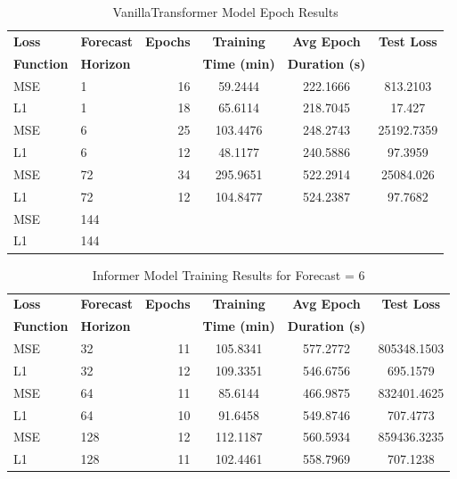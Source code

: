 \documentclass{article}
\begin{document}
\begin{table}
    \footnotesize
    \centering
    \caption{VanillaTransformer Model Epoch Results}
    \begin{tabular}{l|l|r|S|S|S}
        \toprule
        \textbf{Loss} & \textbf{Forecast} & \textbf{Epochs} & \textbf{Training} & \textbf{Avg Epoch} & \textbf{Test Loss} \\
        \textbf{Function} & \textbf{Horizon} & & \textbf{Time (min)} & \textbf{Duration (s)} & \\
        \midrule
        MSE & 1 & 16 & 59.2444 & 222.1666 & 813.2103 \\
        L1 & 1 & 18 & 65.6114 & 218.7045 & 17.427 \\
        \midrule
        MSE & 6 & 25 & 103.4476 & 248.2743 & 25192.7359 \\
        L1 & 6 & 12 & 48.1177 & 240.5886 & 97.3959 \\
        \midrule
        MSE & 72 & 34 & 295.9651 & 522.2914 & 25084.026 \\
        L1 & 72 & 12 & 104.8477 & 524.2387 & 97.7682 \\
        \midrule
        MSE & 144 &  &  &  &  \\
        L1 & 144 &  &  &  &  \\
    \bottomrule
    \end{tabular}
    \label{tab:vanillatransformer_epoch}
\end{table}

\begin{table}
    \centering
    \caption{Informer Model Training Results for Forecast = 6}
    \begin{tabular}{l|l|r|S|S|S}
        \toprule
        \textbf{Loss} & \textbf{Forecast} & \textbf{Epochs} & \textbf{Training} & \textbf{Avg Epoch} & \textbf{Test Loss} \\
        \textbf{Function} & \textbf{Horizon} & & \textbf{Time (min)} & \textbf{Duration (s)} & \\
        \midrule
        MSE & 32 & 11 & 105.8341 & 577.2772 & 805348.1503 \\
        L1 & 32 & 12 & 109.3351 & 546.6756 & 695.1579 \\
        \midrule
        MSE & 64 & 11 & 85.6144 & 466.9875 & 832401.4625 \\
        L1 & 64 & 10 & 91.6458 & 549.8746 & 707.4773 \\
        \midrule
        MSE & 128 & 12 & 112.1187 & 560.5934 & 859436.3235 \\
        L1 & 128 & 11 & 102.4461 & 558.7969 & 707.1238 \\
      \bottomrule
    \end{tabular}
    \label{tab:informer_training_f6}
    \end{table}
\end{document}
